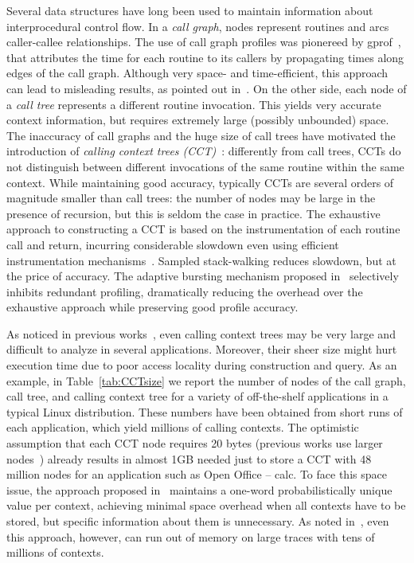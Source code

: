 \documentclass{sigplanconf}
\begin{document}
Several data structures have long been used to maintain information about interprocedural control flow. In a {\em call graph}, nodes represent routines and arcs caller-callee relationships. The use of call graph profiles was pionereed by gprof~\cite{GKM82}, that attributes the time for each  routine to its callers by propagating times along edges of the call graph. Although very space- and time-efficient, this approach can lead to misleading results, as pointed out in~\cite{PF88, S04}. On the other side, each node of a {\em call tree} represents a different routine invocation. This yields very accurate context information, but requires extremely large (possibly unbounded) space.
The inaccuracy of call graphs and the huge size of call trees have motivated the introduction of {\em calling context trees (CCT)}~\cite{ABL97}: differently from call trees, CCTs do not distinguish between different invocations of the same routine within the same context. While maintaining good accuracy, typically CCTs are several orders of magnitude smaller than call trees: the number of nodes may be large in the presence of recursion, but this is seldom the case in practice. The exhaustive approach to constructing a CCT is based on the instrumentation of each routine call and return, incurring considerable slowdown even using efficient instrumentation mechanisms~\cite{ABL97,ZSCC06}. Sampled stack-walking reduces slowdown, but at the price of accuracy. The adaptive bursting mechanism proposed in~\cite{ZSCC06} selectively inhibits redundant profiling, dramatically reducing the overhead over the exhaustive approach while preserving good profile accuracy.

As noticed in previous works~\cite{BM07, ZSCC06}, even calling context trees may be very large and difficult to analyze in several applications. Moreover, their sheer size might hurt execution time due to poor access locality during construction and query. As an example, in Table~\ref{tab:CCTsize} we report the number of nodes of the call graph, call tree, and calling context tree for a variety of off-the-shelf applications in a typical Linux distribution. These numbers have been obtained from short runs of each application, which yield millions of calling contexts. The optimistic assumption that each CCT node requires 20 bytes (previous works use larger nodes~\cite{ABL97,S04}) already results in almost 1GB needed just to store a CCT with 48 million nodes for an application such as Open Office -- calc. To face this space issue, the approach proposed in~\cite{BM07} maintains a one-word probabilistically unique value per context, achieving minimal space overhead when all contexts have to be stored, but specific information about them is unnecessary. As noted in~\cite{BM07}, even this approach, however, can run out of memory on large traces with tens of millions of contexts.
\end{document}
